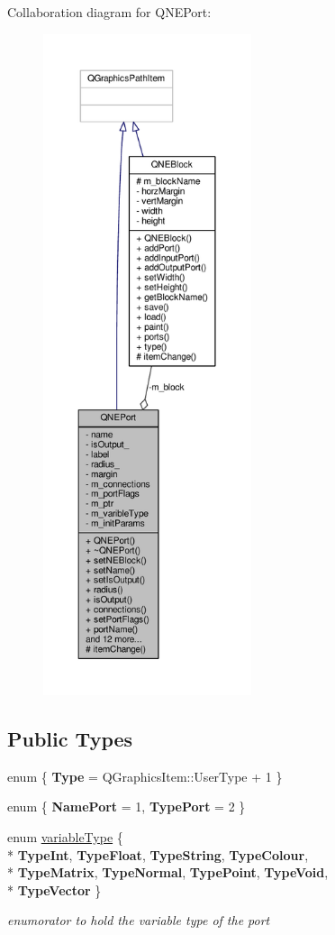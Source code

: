 Collaboration diagram for Q\-N\-E\-Port\-:
\nopagebreak
\begin{figure}[H]
\begin{center}
\leavevmode
\includegraphics[height=550pt]{class_q_n_e_port__coll__graph}
\end{center}
\end{figure}
\subsection*{Public Types}
\begin{DoxyCompactItemize}
\item 
enum \{ {\bfseries Type} = Q\-Graphics\-Item\-:\-:User\-Type + 1
 \}
\item 
enum \{ {\bfseries Name\-Port} = 1, 
{\bfseries Type\-Port} = 2
 \}
\item 
enum \hyperlink{class_q_n_e_port_aeb3a8a2ac138252d1a0afc2c4f00438f}{variable\-Type} \{ \\*
{\bfseries Type\-Int}, 
{\bfseries Type\-Float}, 
{\bfseries Type\-String}, 
{\bfseries Type\-Colour}, 
\\*
{\bfseries Type\-Matrix}, 
{\bfseries Type\-Normal}, 
{\bfseries Type\-Point}, 
{\bfseries Type\-Void}, 
\\*
{\bfseries Type\-Vector}
 \}
\begin{DoxyCompactList}\small\item\em enumorator to hold the variable type of the port \end{DoxyCompactList}\end{DoxyCompactItemize}
